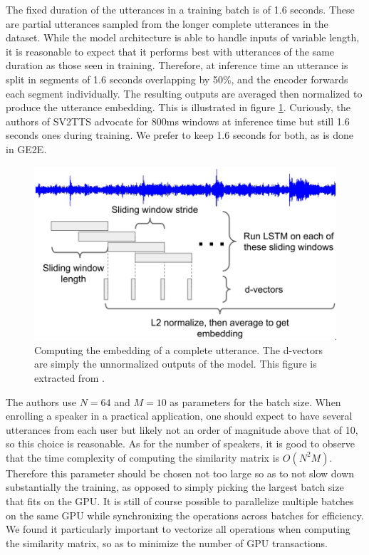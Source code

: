 \documentclass[a4paper, oneside, 12pt, english]{article}
\begin{document}
The fixed duration of the utterances in a training batch is of 1.6 seconds. These are partial utterances sampled from the longer complete utterances in the dataset. While the model architecture is able to handle inputs of variable length, it is reasonable to expect that it performs best with utterances of the same duration as those seen in training. Therefore, at inference time an utterance is split in segments of 1.6 seconds overlapping by 50\%, and the encoder forwards each segment individually. The resulting outputs are averaged then normalized to produce the utterance embedding. This is illustrated in figure \ref{encoder_inference}. Curiously, the authors of SV2TTS advocate for 800ms windows at inference time but still 1.6 seconds ones during training. We prefer to keep 1.6 seconds for both, as is done in GE2E.

\begin{figure}[h]
	\centering
	\includegraphics[width=0.65\linewidth]{images/encoder_inference.png}
	\caption{Computing the embedding of a complete utterance. The d-vectors are simply the unnormalized outputs of the model. This figure is extracted from \citep{GE2E}.}
	\label{encoder_inference}
\end{figure}

The authors use $N = 64$ and $M = 10$ as parameters for the batch size. When enrolling a speaker in a practical application, one should expect to have several utterances from each user but likely not an order of magnitude above that of 10, so this choice is reasonable. As for the number of speakers, it is good to observe that the time complexity of computing the similarity matrix is $O(N^2M)$. Therefore this parameter should be chosen not too large so as to not slow down substantially the training, as opposed to simply picking the largest batch size that fits on the GPU. It is still of course possible to parallelize multiple batches on the same GPU while synchronizing the operations across batches for efficiency. We found it particularly important to vectorize all operations when computing the similarity matrix, so as to minimize the number of GPU transactions.
\end{document}
